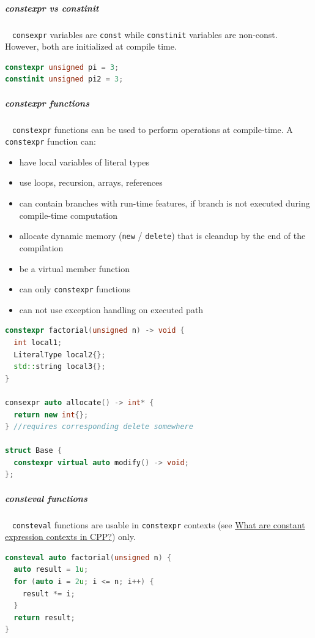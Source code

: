 \documentclass[11pt,twoside,landscape]{article}
\begin{document}
\begin{multicols}{2}
\subparagraph{constexpr vs constinit} \
\label{sec:org01b7b5c}
\texttt{consexpr} variables are \texttt{const} while \texttt{constinit} variables are non-const.
However, both are initialized at compile time.

\begin{lstlisting}[language=c++,label=lst:org83d93dc,caption={constexpr and constinit initialization},captionpos=b,numbers=none]
constexpr unsigned pi = 3;
constinit unsigned pi2 = 3;
\end{lstlisting}

\subparagraph{constexpr functions} \
\label{sec:org9e2ed03}
\texttt{constexpr} functions can be used to perform operations at compile-time.
A \texttt{constexpr} function can:
\begin{itemize}
\item have local variables of literal types
\item use loops, recursion, arrays, references
\item can contain branches with run-time features, if branch is not executed during compile-time computation
\item allocate dynamic memory (\texttt{new} / \texttt{delete}) that is cleandup by the end of the compilation
\item be a virtual member function
\item can only \texttt{constexpr} functions
\item can not use exception handling on executed path
\end{itemize}


\begin{lstlisting}[language=c++,label=lst:orgcaf8f00,caption={Examples for constexpr function usage},captionpos=b,numbers=none]
constexpr factorial(unsigned n) -> void {
  int local1;
  LiteralType local2{};
  std::string local3{};
}

consexpr auto allocate() -> int* {
  return new int{};
} //requires corresponding delete somewhere

struct Base {
  constexpr virtual auto modify() -> void;
};
\end{lstlisting}

\subparagraph{consteval functions} \
\label{sec:orgefcc5ed}
\texttt{consteval} functions are usable in \texttt{constexpr} contexts (see \href{../../../roam/20230629094857-what_are_constant_expression_contexts_in_cpp.org}{What are constant expression contexts in CPP?}) only.

\begin{lstlisting}[language=c++,label=lst:org61f01e6,caption={consteval example},captionpos=b,numbers=none]
consteval auto factorial(unsigned n) {
  auto result = 1u;
  for (auto i = 2u; i <= n; i++) {
    result *= i;
  }
  return result;
}


\end{lstlisting}
\end{multicols}
\end{document}

